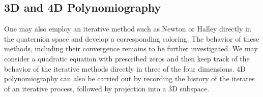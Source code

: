 \documentclass{article}
\theoremstyle{definition}
\begin{document}
\subsection{3D and 4D Polynomiography}


One may also employ an iterative method such as Newton or Halley
directly in the quaternion space and develop a corresponding coloring.
The behavior of these methods, including their convergence
remains to be further investigated.  We may consider a quadratic equation with prescribed zeros and then keep track of the behavior of the iterative methods directly in three of the four dimensions.  4D polynomiography can also be carried out by recording the history of the iterates of an iterative process, followed by projection
into a 3D subspace.
\end{document}
